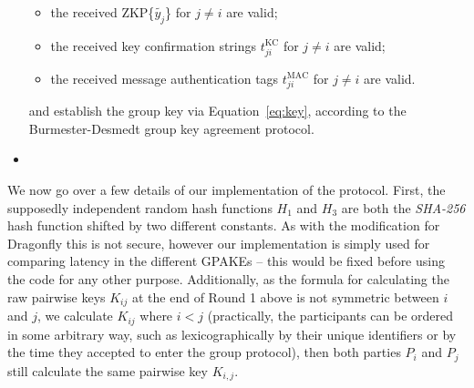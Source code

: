 \begin{itemize}
    \begin{itemize}
            \item the received ZKP\{$\tilde{y_j}$\} for $j \neq i$ are valid;
            \item the received key confirmation strings $t^{\text{KC}}_{ji}$ for $j \neq i$ are valid;
            \item the received message authentication tags $t^{\text{MAC}}_{ji}$ for $j \neq i$ are valid.
        \end{itemize}
        and establish the group key via Equation~\eqref{eq:key}, according to the Burmester-Desmedt group key agreement protocol.
        \item[]
\end{itemize}

We now go over a few details of our implementation of the
protocol. First, the supposedly independent random hash functions $H_1$ and $H_3$ are both the
 \textit{SHA-256} hash function shifted by two different constants. As with the modification for Dragonfly this is not
secure, however our implementation is simply used for comparing latency in the different GPAKEs -- this would be fixed 
before using the code for any other purpose.  Additionally,
as the formula for calculating the raw pairwise keys $K_{ij}$ at the end of
Round 1 above is not symmetric between $i$ and $j$, we calculate $K_{ij}$ where $i < j$ (practically, the 
participants can be ordered in some arbitrary way, such as lexicographically by their unique identifiers 
or by the time they accepted to enter the group protocol), then both parties $P_i$ and $P_j$ still calculate the same pairwise key $K_{i,j}$.


